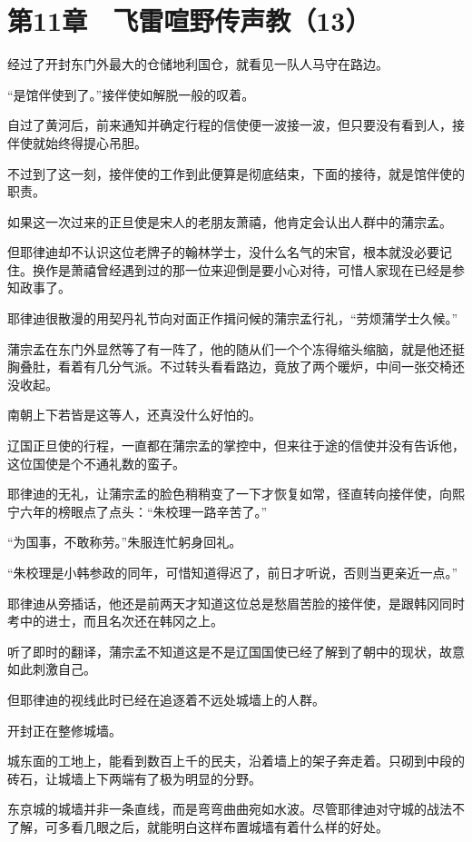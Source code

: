 \section{第11章　飞雷喧野传声教（13）}

经过了开封东门外最大的仓储地利国仓，就看见一队人马守在路边。

“是馆伴使到了。”接伴使如解脱一般的叹着。

自过了黄河后，前来通知并确定行程的信使便一波接一波，但只要没有看到人，接伴使就始终得提心吊胆。

不过到了这一刻，接伴使的工作到此便算是彻底结束，下面的接待，就是馆伴使的职责。

如果这一次过来的正旦使是宋人的老朋友萧禧，他肯定会认出人群中的蒲宗孟。

但耶律迪却不认识这位老牌子的翰林学士，没什么名气的宋官，根本就没必要记住。换作是萧禧曾经遇到过的那一位来迎倒是要小心对待，可惜人家现在已经是参知政事了。

耶律迪很散漫的用契丹礼节向对面正作揖问候的蒲宗孟行礼，“劳烦蒲学士久候。”

蒲宗孟在东门外显然等了有一阵了，他的随从们一个个冻得缩头缩脑，就是他还挺胸叠肚，看着有几分气派。不过转头看看路边，竟放了两个暖炉，中间一张交椅还没收起。

南朝上下若皆是这等人，还真没什么好怕的。

辽国正旦使的行程，一直都在蒲宗孟的掌控中，但来往于途的信使并没有告诉他，这位国使是个不通礼数的蛮子。

耶律迪的无礼，让蒲宗孟的脸色稍稍变了一下才恢复如常，径直转向接伴使，向熙宁六年的榜眼点了点头：“朱校理一路辛苦了。”

“为国事，不敢称劳。”朱服连忙躬身回礼。

“朱校理是小韩参政的同年，可惜知道得迟了，前日才听说，否则当更亲近一点。”

耶律迪从旁插话，他还是前两天才知道这位总是愁眉苦脸的接伴使，是跟韩冈同时考中的进士，而且名次还在韩冈之上。

听了即时的翻译，蒲宗孟不知道这是不是辽国国使已经了解到了朝中的现状，故意如此刺激自己。

但耶律迪的视线此时已经在追逐着不远处城墙上的人群。

开封正在整修城墙。

城东面的工地上，能看到数百上千的民夫，沿着墙上的架子奔走着。只砌到中段的砖石，让城墙上下两端有了极为明显的分野。

东京城的城墙并非一条直线，而是弯弯曲曲宛如水波。尽管耶律迪对守城的战法不了解，可多看几眼之后，就能明白这样布置城墙有着什么样的好处。

